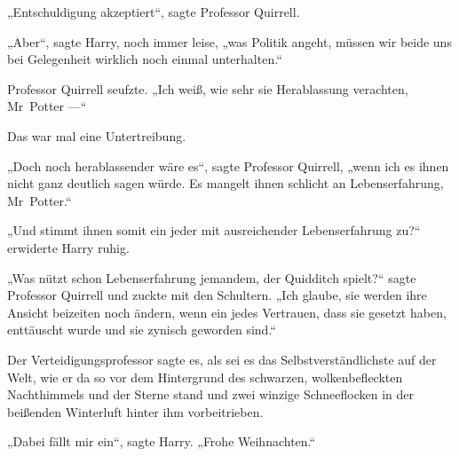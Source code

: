 „Entschuldigung akzeptiert“, sagte Professor Quirrell.

„Aber“, sagte Harry, noch immer leise, „was Politik angeht, müssen wir beide uns bei Gelegenheit wirklich noch einmal unterhalten.“


Professor Quirrell seufzte.
„Ich weiß, wie sehr sie Herablassung verachten, Mr~Potter —“

Das war mal eine Untertreibung.

„Doch noch herablassender wäre es“, sagte Professor Quirrell, „wenn ich es ihnen nicht ganz deutlich sagen würde. Es mangelt ihnen schlicht an Lebenserfahrung, Mr~Potter.“

„Und stimmt ihnen somit ein jeder mit ausreichender Lebenserfahrung zu?“ erwiderte Harry ruhig.

„Was nützt schon Lebenserfahrung jemandem, der Quidditch spielt?“ sagte Professor Quirrell und zuckte mit den Schultern.
„Ich glaube, sie werden ihre Ansicht beizeiten noch ändern, wenn ein jedes Vertrauen, dass sie gesetzt haben, enttäuscht wurde und sie zynisch geworden sind.“

Der Verteidigungsprofessor sagte es, als sei es das Selbstverständlichste auf der Welt, wie er da so vor dem Hintergrund des schwarzen, wolkenbefleckten Nachthimmels und der Sterne stand und zwei winzige Schneeflocken in der beißenden Winterluft hinter ihm vorbeitrieben.

„Dabei fällt mir ein“, sagte Harry.
„Frohe Weihnachten.“

